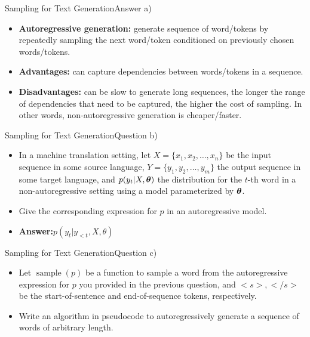 \documentclass[t]{beamer}
\begin{document}
\begin{frame}{Sampling for Text Generation}{Answer a)}
    \begin{itemize}
        \item \textbf{Autoregressive generation:} generate sequence of
              word/tokens by repeatedly sampling the next word/token
              conditioned on previously chosen words/tokens.
              \pause
        \item \textbf{Advantages:} can capture dependencies between
              words/tokens in a sequence.
              \pause
        \item \textbf{Disadvantages:} can be slow to generate long
              sequences, the longer the range of dependencies that need
              to be captured, the higher the cost of sampling.
              In other words, non-autoregressive generation is
              cheaper/faster.
    \end{itemize}
\end{frame}

\begin{frame}{Sampling for Text Generation}{Question b)}
    \begin{itemize}
        \item In a machine translation setting, let
              $X = \{x_1, x_2, \ldots, x_n\}$ be the input sequence in some
              source language, $Y = \{y_1, y_2, \ldots, y_m\}$ the output
              sequence in some target language, and $p(y_t|X,{\boldsymbol{\theta}})$ the
              distribution for the $t$-th word in a non-autoregressive setting
              using a model parameterized by ${\boldsymbol{\theta}}$.
        \item Give the corresponding expression for $p$ in an autoregressive
              model.
              \pause
        \item \textbf{Answer:}$p(y_t|y_{<t},X,\theta)$
    \end{itemize}
\end{frame}

\begin{frame}{Sampling for Text Generation}{Question c)}
    \begin{itemize}
        \item Let $\operatorname{sample}(p)$ be a function to sample a word
              from the autoregressive expression for $p$ you provided in the
              previous question, and $<s>, </s>$ be the start-of-sentence and
              end-of-sequence tokens, respectively.
        \item Write an algorithm in pseudocode to autoregressively generate a
              sequence of words of arbitrary length.
    \end{itemize}
\end{frame}
\end{document}
